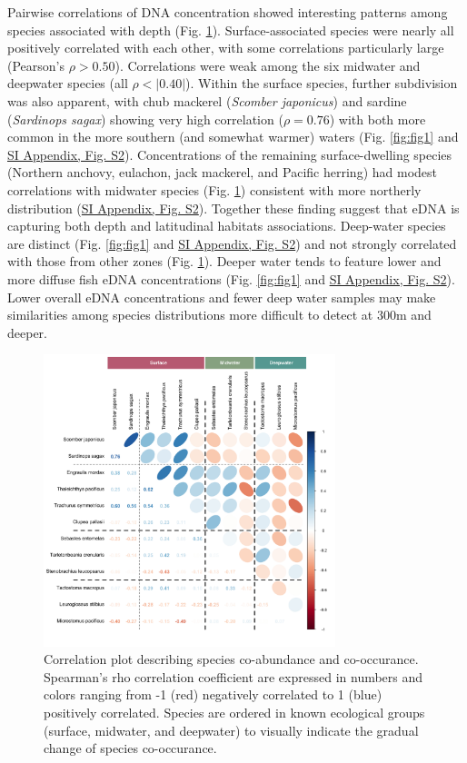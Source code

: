 \documentclass{article}
\begin{document}
Pairwise correlations of DNA concentration showed interesting patterns among species associated with depth (Fig. \ref{fig:fig2}). Surface-associated species were nearly all positively correlated with each other, with some correlations particularly large (Pearson's $\rho > 0.50$). Correlations were weak among the six midwater and deepwater species (all $\rho < |0.40|$). Within the surface species, further subdivision was also apparent, with chub mackerel (\textit{Scomber japonicus}) and sardine (\textit{Sardinops sagax}) showing very high correlation ($\rho = 0.76$) with both more common in the more southern (and somewhat warmer) waters (Fig. \ref{fig:fig1} and \href{SI_Appendix.pdf}{SI Appendix, Fig. S2}). Concentrations of the remaining surface-dwelling species (Northern anchovy, eulachon, jack mackerel, and Pacific herring) had modest correlations with midwater species (Fig. \ref{fig:fig2}) consistent with more northerly distribution (\href{SI_Appendix.pdf}{SI Appendix, Fig. S2}). Together these finding suggest that eDNA is capturing both depth and latitudinal habitats associations. Deep-water species are distinct (Fig. \ref{fig:fig1} and \href{SI_Appendix.pdf}{SI Appendix, Fig. S2}) and not strongly correlated with those from other zones (Fig. \ref{fig:fig2}). Deeper water tends to feature lower and more diffuse fish eDNA concentrations (Fig. \ref{fig:fig1} and \href{SI_Appendix.pdf}{SI Appendix, Fig. S2}). Lower overall eDNA concentrations and fewer deep water samples may make similarities among species distributions more difficult to detect at 300m and deeper.

\begin{figure}[tbhp] 
\centering
\includegraphics[width=8.5cm]{plots/2_Figure_2.jpg}  
\caption{Correlation plot describing species co-abundance and co-occurance. Spearman’s rho correlation coefficient are expressed in numbers and colors ranging from -1 (red) negatively correlated to 1 (blue) positively correlated. Species are ordered in known ecological groups (surface, midwater, and deepwater) to visually indicate the gradual change of species co-occurance.}
\label{fig:fig2}
\end{figure}
\end{document}

